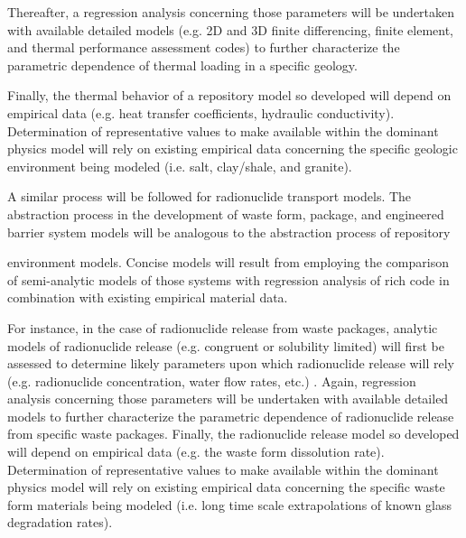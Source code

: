 
Thereafter, a regression analysis concerning those parameters will be undertaken 
with available detailed models (e.g. 2D and 3D finite differencing, finite 
element, and thermal performance assessment codes) to further characterize the 
parametric dependence of thermal loading in a specific geology.  


Finally, the thermal behavior of a repository model so developed will depend on 
empirical data (e.g.  heat transfer coefficients, hydraulic conductivity).  
Determination of representative values to make available within the dominant 
physics model will rely on existing empirical data concerning the specific 
geologic environment being modeled (i.e. salt, clay/shale, and granite). 


A similar process will be followed for radionuclide transport models.  The 
abstraction process in the development of waste form, package, and engineered 
barrier system models will be analogous to the abstraction process of repository 

environment models. Concise models will result from employing the comparison of 
semi-analytic models of those systems with regression analysis of rich code in 
combination with existing empirical material data.


For instance, in the case of radionuclide release from waste packages, analytic 
models of radionuclide release (e.g.  congruent or solubility limited) will 
first be assessed to determine likely parameters upon which radionuclide release 
will rely (e.g.  radionuclide concentration, water flow rates, etc.) 
\cite{kawasaki_congruent_2004}.  Again, regression analysis concerning those 
parameters will be undertaken with available detailed models to further 
characterize the parametric dependence of radionuclide release from specific 
waste packages.  Finally, the radionuclide release model so developed will 
depend on empirical data (e.g. the waste form dissolution rate).  Determination 
of representative values to make available within the dominant physics model 
will rely on existing empirical data concerning the specific waste form  
materials being modeled (i.e. long time scale extrapolations of known glass 
degradation rates).  


